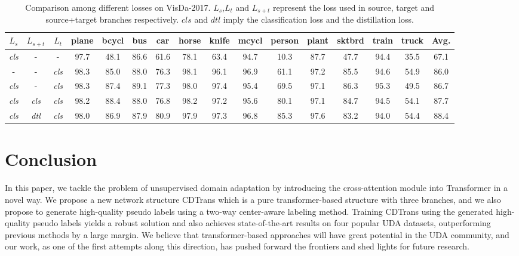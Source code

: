 \documentclass[dvipsnames, svgnames, x11names, table]{article} \usepackage{iclr2022_conference,times}
\begin{document}
\begin{spacing}{1.0}
\begin{table*}[!t]\small
\setlength\tabcolsep{3.4pt}
\begin{tabular}{ccc|cccccccccccc>{\columncolor{lightgray}}c}
\hline
$L_{s}$ & $L_{s+t}$ & $L_{t}$ & plane & bcycl & bus & car & horse & knife & mcycl & person & plant & sktbrd & train & truck & Avg. \\ 
\hline
\textit{cls} & - & - & 97.7 & 48.1 & 86.6 & 61.6 & 78.1 & 63.4 & 94.7 & 10.3 & 87.7 & 47.7 & 94.4 & 35.5 & 67.1 \\
- & - & \textit{cls} & 98.3 & 85.0 & 88.0 & 76.3 & 98.1 & 96.1 & 96.9 & 61.1 & 97.2 & 85.5 & 94.6 & 54.9 & 86.0 \\
\textit{cls} & - & \textit{cls} & 98.3 & 87.4 & 89.1 & 77.3 & 98.0 & 97.4 & 95.4 & 69.5 & 97.1 & 86.3 & 95.3 & 49.5 & 86.7 \\
\textit{cls} & \textit{cls} & \textit{cls} & 98.2 & 88.4 & 88.0 & 76.8 & 98.2 & 97.2 & 95.6 & 80.1 & 97.1 & 84.7 & 94.5 & 54.1 & 87.7 \\
\textit{cls} & \textit{dtl} & \textit{cls} & 98.0 & 86.9 & 87.9 & 80.9 & 97.9 & 97.3 & 96.8 & 85.3 & 97.6 & 83.2 & 94.0 & 54.4 & 88.4 \\
\hline
\end{tabular}
\vspace{-2mm}
\caption{Comparison among different losses on VisDa-2017. $L_{s}$,$L_{t}$ and $L_{s+t}$ represent the loss used in source, target and source+target branches respectively. $cls$ and $dtl$ imply the classification loss and the distillation loss.}
\vspace{-1mm}
\label{tab:lossexpm}
\end{table*}

\section{Conclusion}
In this paper, we tackle the problem of unsupervised domain adaptation by introducing the cross-attention module into Transformer in a novel way. We propose a new network structure CDTrans which is a pure transformer-based structure with three branches, and we also propose to generate high-quality pseudo labels using a two-way center-aware labeling method. Training CDTrans using the generated high-quality pseudo labels yields a robust solution and also achieves state-of-the-art results on four popular UDA datasets, outperforming previous methods by a large margin. We believe that transformer-based approaches will have great potential in the UDA community, and our work, as one of the first attempts along this direction, has pushed forward the frontiers and shed lights for future research.






\end{spacing}
\end{document}
